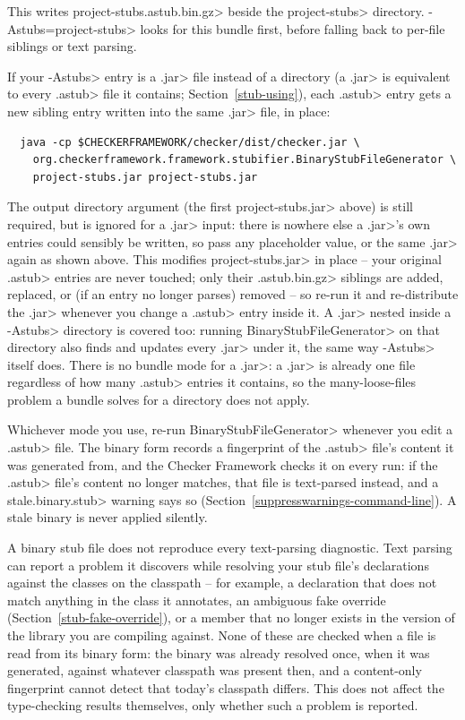 \noindent
This writes \<project-stubs.astub.bin.gz> beside the \<project-stubs>
directory.  \<-Astubs=project-stubs> looks for this bundle first, before
falling back to per-file siblings or text parsing.

If your \<-Astubs> entry is a \<.jar> file instead of a directory (a \<.jar>
is equivalent to every \<.astub> file it contains; Section~\ref{stub-using}),
each \<.astub> entry gets a new sibling entry written into the same \<.jar>
file, in place:

\begin{Verbatim}
  java -cp $CHECKERFRAMEWORK/checker/dist/checker.jar \
    org.checkerframework.framework.stubifier.BinaryStubFileGenerator \
    project-stubs.jar project-stubs.jar
\end{Verbatim}

\noindent
The output directory argument (the first \<project-stubs.jar> above) is
still required, but is ignored for a \<.jar> input: there is nowhere else a
\<.jar>'s own entries could sensibly be written, so pass any placeholder
value, or the same \<.jar> again as shown above.  This modifies
\<project-stubs.jar> in place -- your original \<.astub> entries are never
touched; only their \<.astub.bin.gz> siblings are added, replaced, or (if an
entry no longer parses) removed -- so re-run it and re-distribute the
\<.jar> whenever you change a \<.astub> entry inside it.  A \<.jar> nested
inside a \<-Astubs> directory is covered too: running
\<BinaryStubFileGenerator> on that directory also finds and updates every
\<.jar> under it, the same way \<-Astubs> itself does.  There is no bundle
mode for a \<.jar>: a \<.jar> is already one file regardless of how many
\<.astub> entries it contains, so the many-loose-files problem a bundle
solves for a directory does not apply.

Whichever mode you use, re-run \<BinaryStubFileGenerator> whenever you edit a
\<.astub> file.  The binary form records a fingerprint of the \<.astub>
file's content it was generated from, and the Checker Framework checks it on
every run: if the \<.astub> file's content no longer matches, that file is
text-parsed instead, and a \<stale.binary.stub> warning says so
(Section~\ref{suppresswarnings-command-line}).  A stale binary is never
applied silently.

A binary stub file does not reproduce every text-parsing diagnostic.  Text
parsing can report a problem it discovers while resolving your stub file's
declarations against the classes on the classpath -- for example, a
declaration that does not match anything in the class it annotates, an
ambiguous fake override (Section~\ref{stub-fake-override}), or a member that
no longer exists in the version of the library you are compiling against.
None of these are checked when a file is read from its binary form: the
binary was already resolved once, when it was generated, against whatever
classpath was present then, and a content-only fingerprint cannot detect that
today's classpath differs.  This does not affect the type-checking results
themselves, only whether such a problem is reported.

